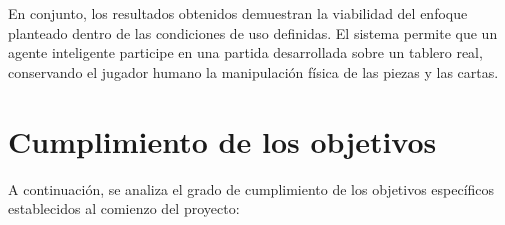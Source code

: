 En conjunto, los resultados obtenidos demuestran la viabilidad del enfoque planteado dentro de las condiciones de uso definidas. El sistema permite que un agente inteligente participe en una partida desarrollada sobre un tablero real, conservando el jugador humano la manipulación física de las piezas y las cartas.


\section{Cumplimiento de los objetivos}
\label{sec:cumplimiento-objetivos}

A continuación, se analiza el grado de cumplimiento de los objetivos específicos establecidos al comienzo del proyecto:

